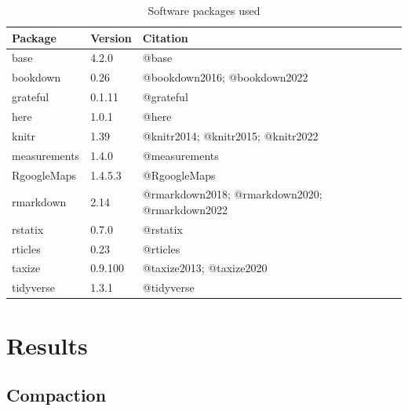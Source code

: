 \documentclass[
  12pt,
]{article}
\begin{document}
\begin{table}

\caption{\label{tab:pkgsTab}Software packages used}
\centering
\begin{tabular}[t]{l|l|l}
\hline
Package & Version & Citation\\
\hline
base & 4.2.0 & @base\\
\hline
bookdown & 0.26 & @bookdown2016; @bookdown2022\\
\hline
grateful & 0.1.11 & @grateful\\
\hline
here & 1.0.1 & @here\\
\hline
knitr & 1.39 & @knitr2014; @knitr2015; @knitr2022\\
\hline
measurements & 1.4.0 & @measurements\\
\hline
RgoogleMaps & 1.4.5.3 & @RgoogleMaps\\
\hline
rmarkdown & 2.14 & @rmarkdown2018; @rmarkdown2020; @rmarkdown2022\\
\hline
rstatix & 0.7.0 & @rstatix\\
\hline
rticles & 0.23 & @rticles\\
\hline
taxize & 0.9.100 & @taxize2013; @taxize2020\\
\hline
tidyverse & 1.3.1 & @tidyverse\\
\hline
\end{tabular}
\end{table}

\hypertarget{results}{%
\section{Results}\label{results}}

\hypertarget{compaction}{%
\subsection{Compaction}\label{compaction}}
\end{document}
